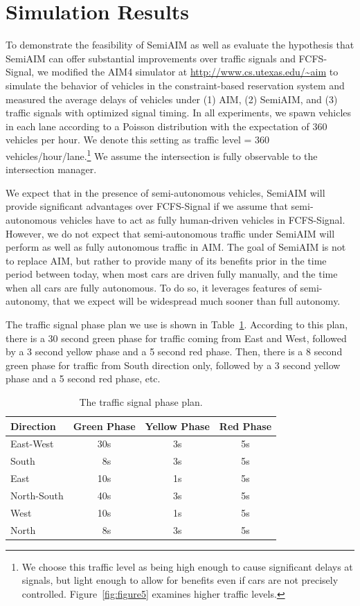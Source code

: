 \section{Simulation Results}

To demonstrate the feasibility of SemiAIM as well as evaluate the
hypothesis that SemiAIM can offer substantial improvements over
traffic signals and FCFS-Signal, we modified the AIM4 simulator at
\url{http://www.cs.utexas.edu/~aim} to simulate the behavior of
vehicles in the constraint-based reservation system and measured the
average delays of vehicles under (1) AIM, (2) SemiAIM, and (3) traffic
signals with optimized signal timing. In all experiments,
we spawn vehicles in each lane according to a Poisson distribution with the
expectation of 360 vehicles per hour. We denote this setting as
traffic level = 360 vehicles/hour/lane.\footnote{We choose this
traffic level as being high enough to cause significant delays at
signals, but light enough to allow for benefits even if cars are not
precisely controlled. Figure~\ref{fig:figure5} examines higher traffic
levels.} We assume the intersection is fully observable to the intersection
manager.

We expect that in the presence of semi-autonomous vehicles, SemiAIM
will provide significant advantages over FCFS-Signal if we assume that
semi-autonomous vehicles have to act as fully human-driven vehicles in
FCFS-Signal.  However, we do not expect that semi-autonomous traffic
under SemiAIM will perform as well as fully autonomous traffic in AIM.
The goal of SemiAIM is not to replace AIM, but rather to provide many
of its benefits prior in the time period between today, when most cars
are driven fully manually, and the time when all cars are fully
autonomous.  To do so, it leverages features of semi-autonomy, that we
expect will be widespread much sooner than full autonomy.

The traffic signal phase plan we use is shown in
Table~\ref{table:phase}.
According to this plan, there is a 30 second
green phase for traffic coming from East and West, followed by a 3
second yellow phase and a 5 second red phase. Then, there is a 8
second green phase for traffic from South direction only, followed by
a 3 second yellow phase and a 5 second red phase, etc.

\begin{table}
\caption{The traffic signal phase plan.}
\label{table:phase}
\centering
\begin{tabular}{|l|c|c|c|}
\hline
Direction & Green Phase & Yellow Phase & Red Phase \\
\hline
  East-West & 30s & 3s & 5s \\
  South & \ 8s & 3s & 5s \\
  East & 10s & 1s & 5s \\
  North-South & 40s & 3s & 5s \\
  West & 10s & 1s & 5s \\
  North & \ 8s & 3s & 5s \\
\hline
\end{tabular}
\end{table}

